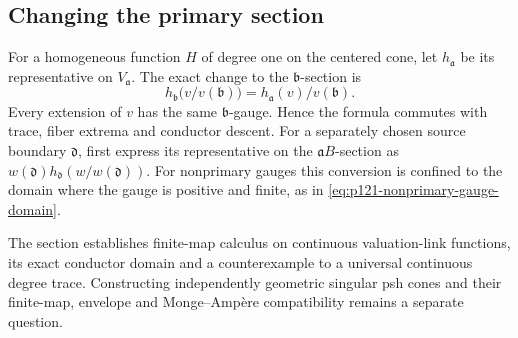 \subsection{Changing the primary section}

For a homogeneous function $H$ of degree one on the centered cone,
let $h_{\mathfrak a}$ be its representative on $V_{\mathfrak a}$.
The exact change to the $\mathfrak b$-section is
\[
 h_{\mathfrak b}\bigl(v/v(\mathfrak b)\bigr)
                  =h_{\mathfrak a}(v)/v(\mathfrak b).
 \tag{70.7j}\label{eq:supplied-p126-radial-transfer}
\]
Every extension of $v$ has the same $\mathfrak b$-gauge. Hence the
formula commutes with trace, fiber extrema and conductor descent.
For a separately chosen source boundary $\mathfrak d$, first express
its representative on the $\mathfrak aB$-section as
$w(\mathfrak d)h_{\mathfrak d}(w/w(\mathfrak d))$.
For nonprimary gauges this conversion is confined to the domain where
the gauge is positive and finite, as in
\eqref{eq:p121-nonprimary-gauge-domain}.

The section establishes finite-map calculus on continuous valuation-link
functions, its exact conductor domain and a counterexample to a universal
continuous degree trace. Constructing independently geometric singular
psh cones and their finite-map, envelope and Monge--Amp\`ere compatibility
remains a separate question.

